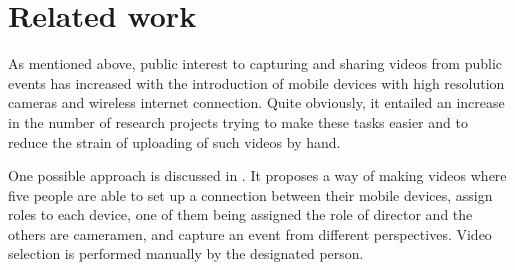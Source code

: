 \documentclass[conference]{IEEEtran}
\begin{document}
%


\section{Related work}

As mentioned above, public interest to capturing and sharing videos from public events has increased 
with the introduction of mobile devices with high resolution cameras and wireless internet connection.
Quite obviously, it entailed an increase in the number of research projects trying to make these tasks easier 
and to reduce the strain of uploading of such videos by hand.

One possible approach is discussed in \cite{engstrom_mobile_2012}.
It proposes a way of making videos where five people are able to set up a connection between their mobile devices,
assign roles to each device, one of them being assigned the role of director and the others are cameramen,
and capture an event from different perspectives. Video selection is performed manually by the designated person.
\end{document}

